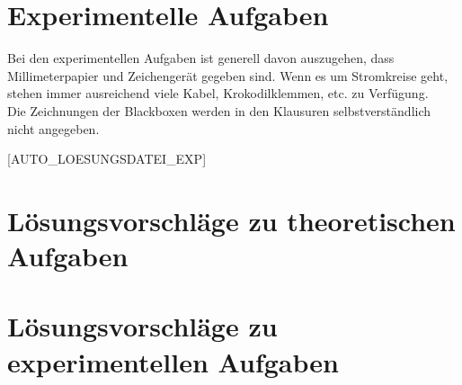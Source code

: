 \section*{Experimentelle Aufgaben}

Bei den experimentellen Aufgaben ist generell davon auszugehen, dass Millimeterpapier und Zeichengerät gegeben sind. Wenn es um Stromkreise geht, stehen immer ausreichend viele Kabel, Krokodilklemmen, etc. zu Verfügung.\\
Die Zeichnungen der Blackboxen werden in den Klausuren selbstverständlich nicht angegeben.

\setcounter{numlabel}{0}
[AUTO_LOESUNGSDATEI_EXP]






\section*{Lösungsvorschläge zu theoretischen Aufgaben}


\section*{Lösungsvorschläge zu experimentellen Aufgaben}



\endinput